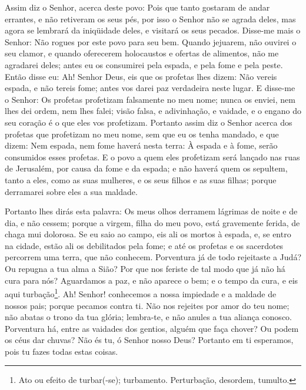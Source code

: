 Assim diz o Senhor, acerca deste povo: Pois que tanto gostaram de
andar errantes, e não retiveram os seus pés, por isso o Senhor não
se agrada deles, mas agora se lembrará da iniqüidade deles, e
visitará os seus pecados. Disse-me mais o Senhor: Não rogues
por este povo para seu bem. Quando jejuarem, não ouvirei o
seu clamor, e quando oferecerem holocaustos e ofertas de alimentos,
não me agradarei deles; antes eu os consumirei pela espada, e pela
fome e pela peste. Então disse eu: Ah! Senhor Deus, eis que
os profetas lhes dizem: Não vereis espada, e não tereis fome; antes
vos darei paz verdadeira neste lugar. E disse-me o Senhor: Os
profetas profetizam falsamente no meu nome; nunca os enviei, nem
lhes dei ordem, nem lhes falei; visão falsa, e adivinhação, e
vaidade, e o engano do seu coração é o que eles vos profetizam.
Portanto assim diz o Senhor acerca dos profetas que
profetizam no meu nome, sem que eu os tenha mandado, e que dizem:
Nem espada, nem fome haverá nesta terra: À espada e à fome, serão
consumidos esses profetas. E o povo a quem eles profetizam
será lançado nas ruas de Jerusalém, por causa da fome e da espada; e
não haverá quem os sepultem, tanto a eles, como as suas mulheres, e
os seus filhos e as suas filhas; porque derramarei sobre eles a sua
maldade.

Portanto lhes dirás esta palavra: Os meus olhos derramem lágrimas
de noite e de dia, e não cessem; porque a virgem, filha do meu povo,
está gravemente ferida, de chaga mui dolorosa. Se eu saio ao
campo, eis ali os mortos à espada, e, se entro na cidade, estão ali
os debilitados pela fome; e até os profetas e os sacerdotes
percorrem uma terra, que não conhecem. Porventura já de todo
rejeitaste a Judá? Ou repugna a tua alma a Sião? Por que nos feriste
de tal modo que já não há cura para nós? Aguardamos a paz, e não
aparece o bem; e o tempo da cura, e eis aqui turbação\footnote{Ato
ou efeito de turbar(-se); turbamento. Perturbação, desordem,
tumulto.}. Ah! Senhor! conhecemos a nossa impiedade e a
maldade de nossos pais; porque pecamos contra ti. Não nos
rejeites por amor do teu nome; não abatas o trono da tua glória;
lembra-te, e não anules a tua aliança conosco. Porventura há,
entre as vaidades dos gentios, alguém que faça chover? Ou podem os
céus dar chuvas? Não és tu, ó Senhor nosso Deus? Portanto em ti
esperamos, pois tu fazes todas estas coisas.

\medskip

